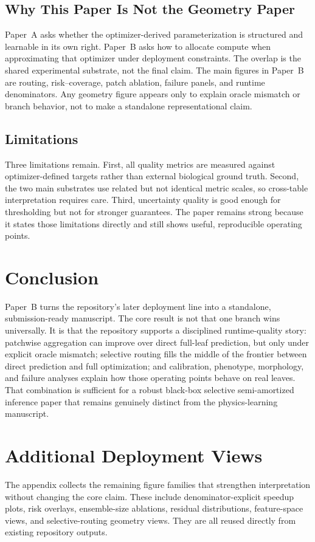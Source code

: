 \documentclass[11pt,a4paper]{article}
\begin{document}
\subsection{Why This Paper Is Not the Geometry Paper}
Paper~A asks whether the optimizer-derived parameterization is structured and learnable in its own right.
Paper~B asks how to allocate compute when approximating that optimizer under deployment constraints.
The overlap is the shared experimental substrate, not the final claim.
The main figures in Paper~B are routing, risk--coverage, patch ablation, failure panels, and runtime denominators.
Any geometry figure appears only to explain oracle mismatch or branch behavior, not to make a standalone representational claim.

\subsection{Limitations}
Three limitations remain.
First, all quality metrics are measured against optimizer-defined targets rather than external biological ground truth.
Second, the two main substrates use related but not identical metric scales, so cross-table interpretation requires care.
Third, uncertainty quality is good enough for thresholding but not for stronger guarantees.
The paper remains strong because it states those limitations directly and still shows useful, reproducible operating points.

\section{Conclusion}
Paper~B turns the repository's later deployment line into a standalone, submission-ready manuscript.
The core result is not that one branch wins universally.
It is that the repository supports a disciplined runtime-quality story: patchwise aggregation can improve over direct full-leaf prediction, but only under explicit oracle mismatch; selective routing fills the middle of the frontier between direct prediction and full optimization; and calibration, phenotype, morphology, and failure analyses explain how those operating points behave on real leaves.
That combination is sufficient for a robust black-box selective semi-amortized inference paper that remains genuinely distinct from the physics-learning manuscript.

\appendix
\clearpage
\section{Additional Deployment Views}
The appendix collects the remaining figure families that strengthen interpretation without changing the core claim.
These include denominator-explicit speedup plots, risk overlays, ensemble-size ablations, residual distributions, feature-space views, and selective-routing geometry views.
They are all reused directly from existing repository outputs.
\end{document}
